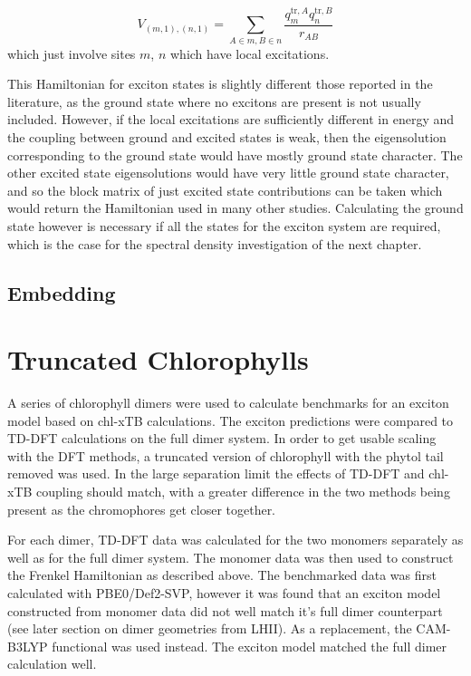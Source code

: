 \begin{equation}
    V_{\left(m, 1\right), \left(n,1\right)} = \sum_{A \in m, B \in n} \frac{q^{\text{tr},A}_m q^{\text{tr},B}_n}{r_{AB}}
\end{equation}
%
which just involve sites $m$, $n$ which have local excitations.

This Hamiltonian for exciton states is slightly different those reported in the 
literature, as the ground state where no excitons are present is not usually included.
However, if the local excitations are sufficiently different in energy and the coupling
between ground and excited states is weak, then the eigensolution corresponding 
to the ground state would have mostly ground state character. The other excited
state eigensolutions would have very little ground state character, and so the block
matrix of just excited state contributions can be taken which would return the Hamiltonian
used in many other studies. Calculating the ground state however is necessary if
all the states for the exciton system are required, which is the case for the
spectral density investigation of the next chapter.

\subsection{Embedding}
\label{subsec:embedding}



\section{Truncated Chlorophylls}
\label{sec:trunc_chl}

A series of chlorophyll dimers were used to calculate benchmarks for an exciton
model based on chl-xTB calculations. The exciton predictions were compared to TD-DFT
calculations on the full dimer system. In order to get usable scaling with the DFT
methods, a truncated version of chlorophyll with the phytol tail removed was used.
In the large separation limit the effects of TD-DFT and chl-xTB coupling should 
match, with a greater difference in the two methods being present as the chromophores
get closer together.

For each dimer, TD-DFT data was calculated for the two monomers separately as well
as for the full dimer system. The monomer data was then used to construct the Frenkel
Hamiltonian as described above.
The benchmarked data was first calculated with PBE0/Def2-SVP, however it was found 
that an exciton model constructed from monomer data did not well match it's full 
dimer counterpart (see later section on dimer geometries from LHII). As a replacement,
the CAM-B3LYP functional was used instead. The exciton model matched the full dimer
calculation well.

